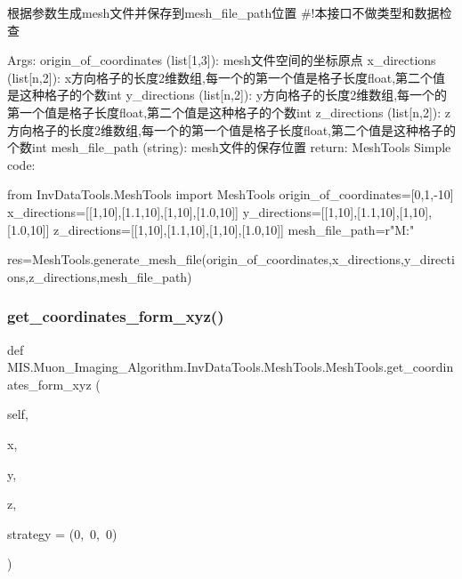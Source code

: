 \begin{DoxyVerb}根据参数生成mesh文件并保存到mesh_file_path位置
#!本接口不做类型和数据检查

Args:
    origin_of_coordinates (list[1,3]): mesh文件空间的坐标原点
    x_directions (list[n,2]):  x方向格子的长度2维数组,每一个的第一个值是格子长度float,第二个值是这种格子的个数int
    y_directions (list[n,2]): y方向格子的长度2维数组,每一个的第一个值是格子长度float,第二个值是这种格子的个数int
    z_directions (list[n,2]): z方向格子的长度2维数组,每一个的第一个值是格子长度float,第二个值是这种格子的个数int
    mesh_file_path (string): mesh文件的保存位置
return:
    MeshTools
Simple code:

from InvDataTools.MeshTools import MeshTools
origin_of_coordinates=[0,1,-10]
x_directions=[[1,10],[1.1,10],[1,10],[1.0,10]]
y_directions=[[1,10],[1.1,10],[1,10],[1.0,10]]
z_directions=[[1,10],[1.1,10],[1,10],[1.0,10]]
mesh_file_path=r"M:\pycharm\Inversion\Temp\mesh"

res=MeshTools.generate_mesh_file(origin_of_coordinates,x_directions,y_directions,z_directions,mesh_file_path)
\end{DoxyVerb}
 \mbox{\label{classMIS_1_1Muon__Imaging__Algorithm_1_1InvDataTools_1_1MeshTools_1_1MeshTools_aed6cf5f1e3ced408db47ddb879e09682}} 
\subsubsection{\texorpdfstring{get\+\_\+coordinates\+\_\+form\+\_\+xyz()}{get\_coordinates\_form\_xyz()}}
{\footnotesize\ttfamily def M\+I\+S.\+Muon\+\_\+\+Imaging\+\_\+\+Algorithm.\+Inv\+Data\+Tools.\+Mesh\+Tools.\+Mesh\+Tools.\+get\+\_\+coordinates\+\_\+form\+\_\+xyz (\begin{DoxyParamCaption}\item[{}]{self,  }\item[{}]{x,  }\item[{}]{y,  }\item[{}]{z,  }\item[{}]{strategy = {\ttfamily (0,~0,~0)} }\end{DoxyParamCaption})}

